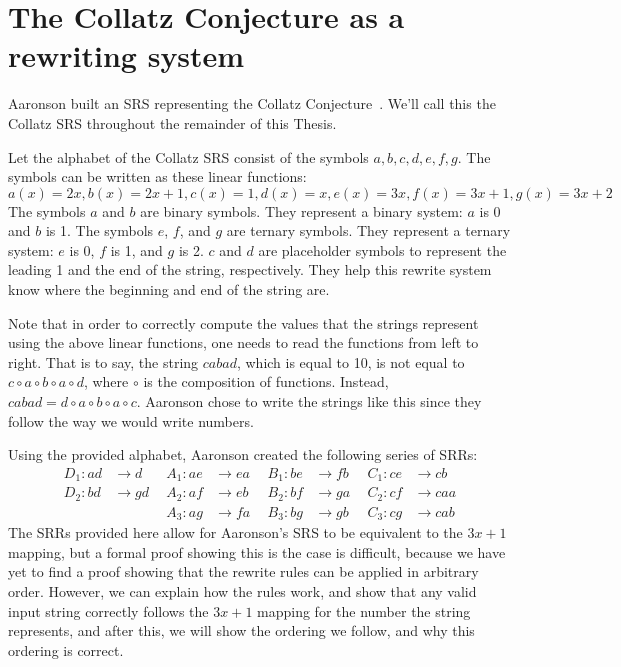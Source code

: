 \section{The Collatz Conjecture as a rewriting system} \label{subsec:CollatzSRS}
Aaronson built an SRS representing the Collatz Conjecture~\cite{HeuleAaronson}. We'll call this the Collatz SRS throughout the remainder of this Thesis. \par
Let the alphabet of the Collatz SRS consist of the symbols $a, b, c, d, e, f, g$. The symbols can be written as these linear functions:
\[
a(x) = 2x, b(x) = 2x+1, c(x) = 1, d(x) = x, e(x) = 3x, f(x) = 3x+1, g(x) = 3x+2
\]
The symbols $a$ and $b$ are binary symbols. They represent  a binary system: $a$ is 0 and $b$ is 1.  The symbols $e$, $f$, and $g$ are ternary symbols. They represent a ternary system: $e$ is 0, $f$ is 1, and $g$ is 2. $c$ and $d$ are placeholder symbols to represent the leading 1 and the end of the string, respectively. They help this rewrite system know where the beginning and end of the string are. \par
Note that in order to correctly compute the values that the strings represent using the above linear functions, one needs to read the functions from left to right. That is to say, the string $cabad$, which is equal to 10, is not equal to $ c \circ a \circ b \circ a \circ d$, where $\circ$ is the composition of functions. Instead, $cabad = d \circ a \circ b \circ a \circ c$. Aaronson chose to write the strings like this since they follow the way we would write numbers. \par
Using the provided alphabet, Aaronson created the following series of SRRs:
\begin{align*}
    D_1 : ad &\rightarrow d\ & \ A_1 : ae &\rightarrow ea\ & \ B_1 : be &\rightarrow fb\ & \ C_1 : ce &\rightarrow cb \\
    D_2 : bd &\rightarrow gd\ & \ A_2 : af &\rightarrow eb\ & \ B_2 : bf &\rightarrow ga\ & \ C_2 : cf &\rightarrow caa \\
    &\ &\ A_3 : ag &\rightarrow fa\ &\ B_3 : bg &\rightarrow gb\ &\ C_3 : cg &\rightarrow cab
\end{align*}
The SRRs provided here allow for Aaronson's SRS to be equivalent to the $3x+1$ mapping, but a formal proof showing this is the case is difficult, because we have yet to find a proof showing that the rewrite rules can be applied in arbitrary order. However, we can explain how the rules work, and show that any valid input string correctly follows the $3x+1$ mapping for the number the string represents, and after this, we will show the ordering we follow, and why this ordering is correct. \par
